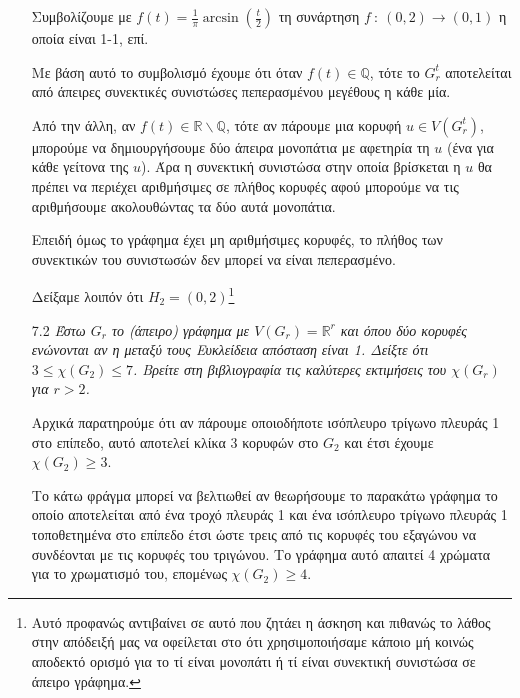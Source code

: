 \documentclass[a4paper, oneside, 11pt]{article}
\theoremstyle{definition}
\begin{document}
\begin{enumerate}
   Συμβολίζουμε με $f(t) = \frac{1}{\pi} \arcsin \left( \frac{t}{2} \right)$
   τη συνάρτηση $f\ :\ (0, 2) \rightarrow (0, 1)$ η οποία είναι
   1-1, επί.
   
   Με βάση αυτό το συμβολισμό έχουμε ότι όταν $f(t) \in \mathbb{Q}$,
   τότε το $G_r^t$ αποτελείται από άπειρες συνεκτικές συνιστώσες
   πεπερασμένου μεγέθους η κάθε μία.

   Από την άλλη, αν $f(t) \in \mathbb{R} \backslash \mathbb{Q}$,
   τότε αν πάρουμε μια κορυφή $u \in V(G_r^t)$, μπορούμε να δημιουργήσουμε
   δύο άπειρα μονοπάτια με αφετηρία τη $u$ (ένα για
   κάθε γείτονα της $u$). Άρα η συνεκτική συνιστώσα στην οποία
   βρίσκεται η $u$ θα πρέπει να περιέχει αριθμήσιμες σε πλήθος κορυφές
   αφού μπορούμε να τις αριθμήσουμε ακολουθώντας τα δύο αυτά μονοπάτια.

   Επειδή όμως το γράφημα έχει μη αριθμήσιμες κορυφές, το πλήθος
   των συνεκτικών του συνιστωσών δεν μπορεί να είναι πεπερασμένο.

   Δείξαμε λοιπόν ότι $H_2 = (0, 2)$\footnote{Αυτό προφανώς αντιβαίνει σε αυτό
   που ζητάει η άσκηση και πιθανώς το λάθος στην απόδειξή μας να οφείλεται
   στο ότι χρησιμοποιήσαμε κάποιο μή κοινώς αποδεκτό ορισμό για το τί είναι
   μονοπάτι ή τί είναι συνεκτική συνιστώσα σε άπειρο γράφημα.}


   \item[7.2] \emph{Έστω $G_r$ το (άπειρο) γράφημα με $V(G_r) = \mathbb{R}^r$
   και όπου δύο κορυφές ενώνονται αν η μεταξύ τους Ευκλείδεια απόσταση είναι
   1. Δείξτε ότι $3 \leq \chi(G_2) \leq 7$. Βρείτε στη βιβλιογραφία
   τις καλύτερες εκτιμήσεις του $\chi(G_r)$ για $r > 2$.}

   Αρχικά παρατηρούμε ότι αν πάρουμε οποιοδήποτε ισόπλευρο τρίγωνο
   πλευράς 1 στο επίπεδο, αυτό αποτελεί κλίκα 3 κορυφών στο $G_2$ και
   έτσι έχουμε $\chi(G_2) \geq 3$.

   Το κάτω φράγμα μπορεί να βελτιωθεί αν θεωρήσουμε το παρακάτω γράφημα
   το οποίο αποτελείται από ένα τροχό πλευράς 1 και ένα
   ισόπλευρο τρίγωνο πλευράς 1
   τοποθετημένα στο επίπεδο έτσι ώστε τρεις από τις κορυφές του εξαγώνου
   να συνδέονται με τις κορυφές του τριγώνου. Το γράφημα αυτό
   απαιτεί 4 χρώματα για το χρωματισμό του, επομένως $\chi(G_2) \geq 4$.


\end{enumerate}
\end{document}
